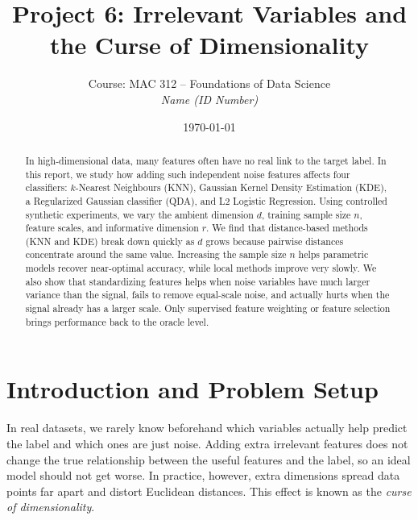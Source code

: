 \documentclass[11pt, a4paper]{article}
\title{\textbf{Project 6: Irrelevant Variables and the Curse of Dimensionality}}
\author{Course: MAC 312 -- Foundations of Data Science \\[4pt]
        \textit{Name (ID Number)}}
\date{\today}
\begin{document}
\maketitle

\begin{abstract}
In high-dimensional data, many features often have no real link to the target label. In this report, we study how adding such independent noise features affects four classifiers: $k$-Nearest Neighbours (KNN), Gaussian Kernel Density Estimation (KDE), a Regularized Gaussian classifier (QDA), and L2 Logistic Regression. Using controlled synthetic experiments, we vary the ambient dimension $d$, training sample size $n$, feature scales, and informative dimension $r$. We find that distance-based methods (KNN and KDE) break down quickly as $d$ grows because pairwise distances concentrate around the same value. Increasing the sample size $n$ helps parametric models recover near-optimal accuracy, while local methods improve very slowly. We also show that standardizing features helps when noise variables have much larger variance than the signal, fails to remove equal-scale noise, and actually hurts when the signal already has a larger scale. Only supervised feature weighting or feature selection brings performance back to the oracle level.
\end{abstract}

\section{Introduction and Problem Setup}

In real datasets, we rarely know beforehand which variables actually help predict the label and which ones are just noise. Adding extra irrelevant features does not change the true relationship between the useful features and the label, so an ideal model should not get worse. In practice, however, extra dimensions spread data points far apart and distort Euclidean distances. This effect is known as the \textit{curse of dimensionality}.
\end{document}
